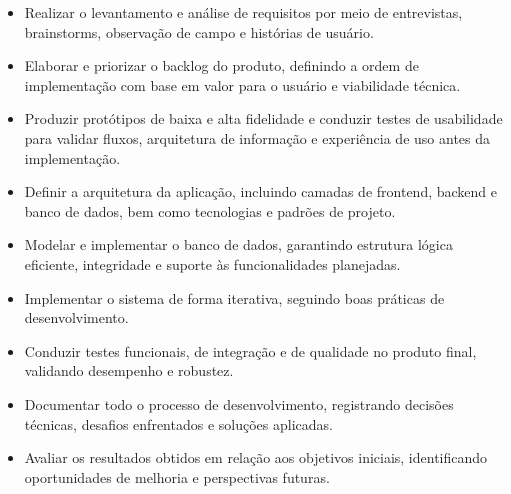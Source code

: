 \begin{itemize}
    \item Realizar o levantamento e análise de requisitos por meio de entrevistas, brainstorms, observação de campo e histórias de usuário.
    \item Elaborar e priorizar o backlog do produto, definindo a ordem de implementação com base em valor para o usuário e viabilidade técnica.
    \item Produzir protótipos de baixa e alta fidelidade e conduzir testes de usabilidade para validar fluxos, arquitetura de informação e experiência de uso antes da implementação.
    \item Definir a arquitetura da aplicação, incluindo camadas de frontend, backend e banco de dados, bem como tecnologias e padrões de projeto.
    \item Modelar e implementar o banco de dados, garantindo estrutura lógica eficiente, integridade e suporte às funcionalidades planejadas.
    \item Implementar o sistema de forma iterativa, seguindo boas práticas de desenvolvimento.
    \item Conduzir testes funcionais, de integração e de qualidade no produto final, validando desempenho e robustez.
    \item Documentar todo o processo de desenvolvimento, registrando decisões técnicas, desafios enfrentados e soluções aplicadas.
    \item Avaliar os resultados obtidos em relação aos objetivos iniciais, identificando oportunidades de melhoria e perspectivas futuras.
\end{itemize}